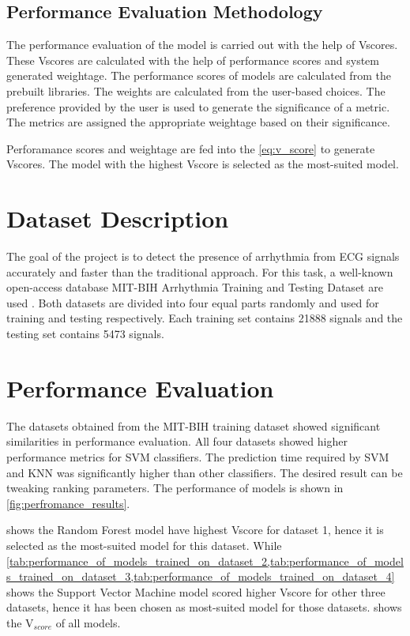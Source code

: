 \subsection{Performance Evaluation Methodology} \label{subsec:performance_evaluation_methodology}

The performance evaluation of the model is carried out with the help of Vscores. These Vscores are calculated with the help of performance scores and system generated weightage. The performance scores of models are calculated from the prebuilt libraries. The weights are calculated from the user-based choices. The preference provided by the user is used to generate the significance of a metric. The metrics are assigned the appropriate weightage based on their significance.

Perforamance scores and weightage are fed into the \cref{eq:v_score} to generate Vscores. The model with the highest Vscore is selected as the most-suited model.

\section{Dataset Description} \label{sec:dataset_description}

The goal of the project is to detect the presence of arrhythmia from ECG signals accurately and faster than the traditional approach. For this task, a well-known open-access database MIT-BIH Arrhythmia Training and Testing Dataset are used . Both datasets are divided into four equal parts randomly and used for training and testing respectively. Each training set contains 21888 signals and the testing set contains 5473 signals.

\section{Performance Evaluation} \label{sec:performance_evaluation}

The datasets obtained from the MIT-BIH training dataset showed significant similarities in performance evaluation. All four datasets showed higher performance metrics for SVM classifiers. The prediction time required by SVM and KNN was significantly higher than other classifiers. The desired result can be tweaking ranking parameters. The performance of models is shown in \cref{fig:perfromance_results}.

 shows the Random Forest model have highest Vscore for dataset 1, hence it is selected as the most-suited model for this dataset. While \cref{tab:performance_of_models_trained_on_dataset_2,tab:performance_of_models_trained_on_dataset_3,tab:performance_of_models_trained_on_dataset_4} shows the Support Vector Machine model scored higher Vscore for other three datasets, hence it has been chosen as most-suited model for those datasets.  shows the V$_{score}$ of all models.

